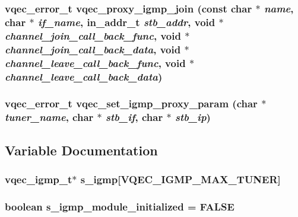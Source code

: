 \subsubsection{\setlength{\rightskip}{0pt plus 5cm}vqec\_\-error\_\-t vqec\_\-proxy\_\-igmp\_\-join (const char $\ast$ {\em name}, char $\ast$ {\em if\_\-name}, in\_\-addr\_\-t {\em stb\_\-addr}, void $\ast$ {\em channel\_\-join\_\-call\_\-back\_\-func}, void $\ast$ {\em channel\_\-join\_\-call\_\-back\_\-data}, void $\ast$ {\em channel\_\-leave\_\-call\_\-back\_\-func}, void $\ast$ {\em channel\_\-leave\_\-call\_\-back\_\-data})}\label{vqec__igmp_8c_4fe27944c8062d69d2d34cd036b617b0}


\subsubsection{\setlength{\rightskip}{0pt plus 5cm}vqec\_\-error\_\-t vqec\_\-set\_\-igmp\_\-proxy\_\-param (char $\ast$ {\em tuner\_\-name}, char $\ast$ {\em stb\_\-if}, char $\ast$ {\em stb\_\-ip})}\label{vqec__igmp_8c_613ccba9f602a715b6f0b422721b95a2}




\subsection{Variable Documentation}
\subsubsection{\setlength{\rightskip}{0pt plus 5cm}\bf{vqec\_\-igmp\_\-t}$\ast$ \bf{s\_\-igmp}[VQEC\_\-IGMP\_\-MAX\_\-TUNER]\hspace{0.3cm}{\tt  [static]}}\label{vqec__igmp_8c_750063e971178611840614ddd1d7ce5f}


\subsubsection{\setlength{\rightskip}{0pt plus 5cm}boolean \bf{s\_\-igmp\_\-module\_\-initialized} = \bf{FALSE}\hspace{0.3cm}{\tt  [static]}}\label{vqec__igmp_8c_24aa3eecf8c309c3ee4a465835502329}


